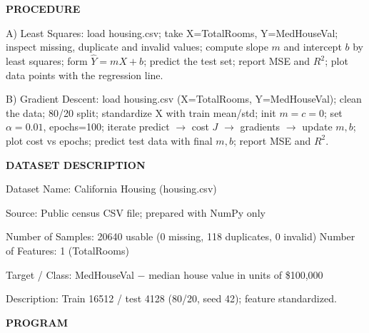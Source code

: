 \documentclass[11pt,twoside]{article}
\newcommand{\expheading}[1]{{\fontsize{14}{17}\selectfont\textbf{#1}\par}}
\begin{document}
{\expheading{PROCEDURE}
\vspace{4pt}
\noindent A) Least Squares: load housing.csv; take X=TotalRooms, Y=MedHouseVal; inspect missing, duplicate and invalid values; compute slope $m$ and intercept $b$ by least squares; form $\hat{Y}=mX+b$; predict the test set; report MSE and $R^2$; plot data points with the regression line.\par
\noindent B) Gradient Descent: load housing.csv (X=TotalRooms, Y=MedHouseVal); clean the data; 80/20 split; standardize X with train mean/std; init $m=c=0$; set $\alpha=0.01$, epochs=100; iterate predict $\rightarrow$ cost $J$ $\rightarrow$ gradients $\rightarrow$ update $m,b$; plot cost vs epochs; predict test data with final $m,b$; report MSE and $R^2$.\par
\vspace{4pt}

\expheading{DATASET DESCRIPTION}
\vspace{4pt}
\noindent Dataset Name: California Housing (housing.csv)\par
\noindent Source: Public census CSV file; prepared with NumPy only\par
\noindent Number of Samples: 20640 usable (0 missing, 118 duplicates, 0 invalid) \hspace{0.3cm} Number of Features: 1 (TotalRooms)\par
\noindent Target / Class: MedHouseVal $-$ median house value in units of \$100{,}000\par
\noindent Description: Train 16512 / test 4128 (80/20, seed 42); feature standardized. \par
\vspace{4pt}
} %

\newpage
\expheading{PROGRAM}
\vspace{6pt}
\end{document}
